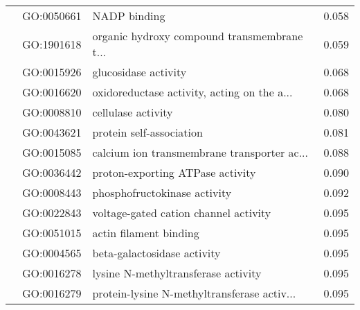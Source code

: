 \begin{longtable}{lllr}
   & GO:0050661 &                                 NADP binding &         0.058 \\
   & GO:1901618 &  organic hydroxy compound transmembrane t... &         0.059 \\
   & GO:0015926 &                         glucosidase activity &         0.068 \\
   & GO:0016620 &  oxidoreductase activity, acting on the a... &         0.068 \\
   & GO:0008810 &                           cellulase activity &         0.080 \\
   & GO:0043621 &                     protein self-association &         0.081 \\
   & GO:0015085 &  calcium ion transmembrane transporter ac... &         0.088 \\
   & GO:0036442 &             proton-exporting ATPase activity &         0.090 \\
   & GO:0008443 &                 phosphofructokinase activity &         0.092 \\
   & GO:0022843 &        voltage-gated cation channel activity &         0.095 \\
   & GO:0051015 &                       actin filament binding &         0.095 \\
   & GO:0004565 &                  beta-galactosidase activity &         0.095 \\
   & GO:0016278 &          lysine N-methyltransferase activity &         0.095 \\
   & GO:0016279 &  protein-lysine N-methyltransferase activ... &         0.095 \\
\end{longtable}
